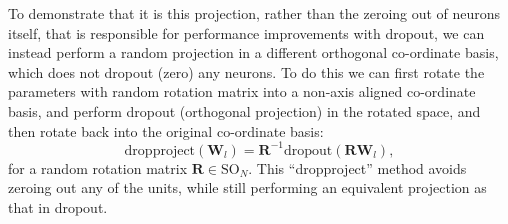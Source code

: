 \documentclass[thesis]{subfiles}
\begin{document}
To demonstrate that it is this projection, rather than the zeroing out of neurons itself, that is responsible for performance improvements with dropout, we can instead perform a random projection in a different orthogonal co-ordinate basis, which does not dropout (zero) any neurons. To do this we can first rotate the parameters with random rotation matrix into a non-axis aligned co-ordinate basis, and perform dropout (orthogonal projection) in the rotated space, and then rotate back into the original co-ordinate basis:
\begin{equation}
    \textrm{dropproject}(\mathbf{W}_l) = \mathbf{R}^{-1}\textrm{dropout}(\mathbf{R} \mathbf{W}_l),
\end{equation}
for a random rotation matrix $\mathbf{R}\in \textrm{SO}_N$. This ``dropproject'' method avoids zeroing out any of the units, while still performing an equivalent projection as that in dropout.
\end{document}

